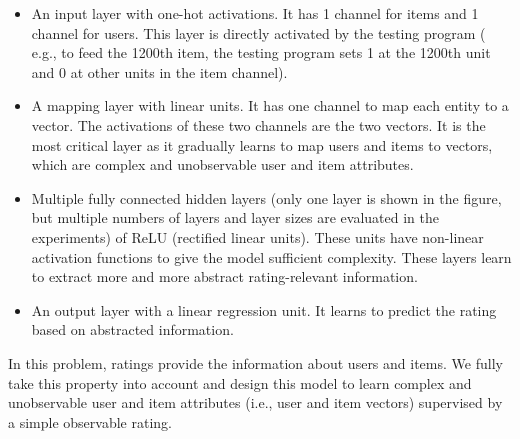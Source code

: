 \documentclass[sigconf]{acmart}
\begin{document}
\begin{itemize}
	\item An input layer with one-hot activations.
	It has 1 channel for items and 1 channel for users.
	This layer is directly activated by the testing program (
	e.g., to feed the 1200th item, the testing program sets 1 at the 1200th 
	unit and 0 at other units in the item channel).
	\item A mapping layer with linear units. It has one channel to map each 
	entity to a vector.
	The activations of these two channels are the two vectors.
	It is the most critical layer as it gradually learns to map users and 
	items to vectors,
	which are complex and unobservable user and item attributes.
	\item Multiple fully connected hidden layers (only one layer is shown in the
	figure, but	multiple numbers of layers and layer sizes are evaluated in 
	the experiments) of ReLU (rectified linear units).
	These units have non-linear activation functions to give the model 
	sufficient complexity.
	These layers learn to extract more and more abstract rating-relevant 
	information.
	\item An output layer with a linear regression unit.
	It learns to predict the rating based on abstracted information.
\end{itemize}
In this problem, ratings provide the information about users and items.
We fully take this property into account and design this model to learn 
complex and unobservable user and item attributes (i.e., user and item vectors) 
supervised by a simple observable rating.
\end{document}
